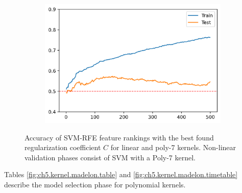\begin{figure}[H]
\begin{subfigure}[b]{0.32\linewidth}
    \end{subfigure}
    \begin{subfigure}[b]{0.32\linewidth}
        \includegraphics[width=\linewidth]{img/ch5/madelon-random-c_1}
    \end{subfigure}
    \caption{Accuracy of SVM-RFE feature rankings with the best found regularization coefficient $C$ for linear and poly-7 kernels. Non-linear validation phases consist of SVM with a Poly-7 kernel.}
    \label{fig:ch5.kernel.cmp3}
\end{figure}

Tables \ref{fig:ch5.kernel.madelon.table} and \ref{fig:ch5.kernel.madelon.timetable} describe the model selection phase for polynomial kernels.

